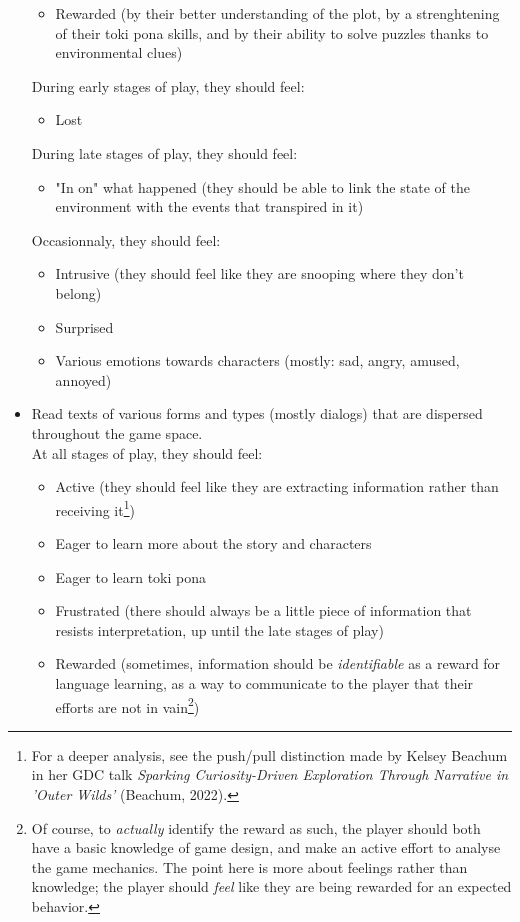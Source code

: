 \documentclass{scrartcl}
\begin{document}
\begin{itemize}
\begin{itemize}
					\item Rewarded (by their better understanding of the plot, by a strenghtening of their toki pona skills, and by their ability to solve puzzles thanks to environmental clues)
				\end{itemize}
				During early stages of play, they should feel: 
				\begin{itemize}
					\item Lost
				\end{itemize}
				During late stages of play, they should feel:
				\begin{itemize}
					\item "In on" what happened (they should be able to link the state of the environment with the events that transpired in it)
				\end{itemize}
				Occasionnaly, they should feel:
				\begin{itemize}
					\item Intrusive (they should feel like they are snooping where they don't belong)
					\item Surprised
					\item Various emotions towards characters (mostly: sad, angry, amused, annoyed)
				\end{itemize}
				\item Read texts of various forms and types (mostly dialogs) that are dispersed throughout the game space.\\
				At all stages of play, they should feel:
				\begin{itemize}
					\item Active (they should feel like they are extracting information rather than receiving it\footnote{For a deeper analysis, see the push/pull distinction made by Kelsey Beachum in her GDC talk \textit{Sparking Curiosity-Driven Exploration Through Narrative in 'Outer Wilds'} (Beachum, 2022).})
					\item Eager to learn more about the story and characters
					\item Eager to learn toki pona
					\item Frustrated (there should always be a little piece of information that resists interpretation, up until the late stages of play)
					\item Rewarded (sometimes, information should be \textit{identifiable} as a reward for language learning, as a way to communicate to the player that their efforts are not in vain\footnote{Of course, to \textit{actually} identify the reward as such, the player should both have a basic knowledge of game design, and make an active effort to analyse the game mechanics. The point here is more about feelings rather than knowledge; the player should \textit{feel} like they are being rewarded for an expected behavior.})

\end{itemize}
\end{itemize}
\end{document}
